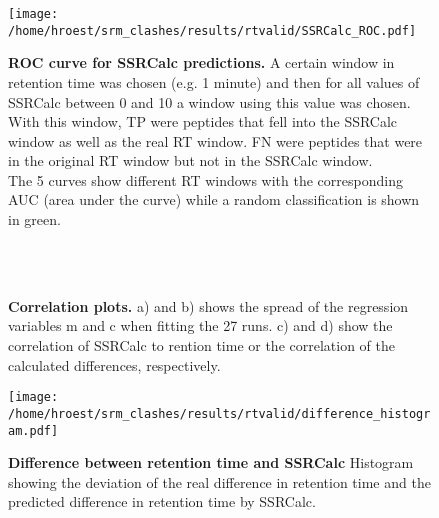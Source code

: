 \begin{figure}
\texttt{[image: /home/hroest/srm\_clashes/results/rtvalid/SSRCalc\_ROC.pdf]}
\caption{ \textbf{ROC curve for SSRCalc predictions.}
A certain window in retention time was chosen (e.g. 1 minute) and then for all
values of SSRCalc between 0 and 10 a window using this value was chosen. With
this window, TP were peptides that fell into the SSRCalc window as well as the
real RT window. FN were peptides that were in the original RT window but not in
the SSRCalc window. \\
The 5 curves show different RT windows with the corresponding AUC (area under
the curve) while a random classification is shown in green.}
\label{fig:SSRCalcROC}
\end{figure}


\begin{figure}

\center
{} 
  \\
 \\

\caption{ \textbf{Correlation plots.}
a) and b) shows the spread of the regression variables m and c when fitting the 27 runs. c) and d) show the correlation of SSRCalc to rention time or the correlation of the calculated differences, respectively. }
\label{fig:400ra.comp}
\end{figure}


\begin{figure}
\texttt{[image: /home/hroest/srm\_clashes/results/rtvalid/difference\_histogram.pdf]}
\caption{ \textbf{Difference between retention time and SSRCalc}
Histogram showing the deviation of the real difference in retention time and the predicted difference in retention time by SSRCalc. }
\label{fig:DiffHist}
\end{figure}


